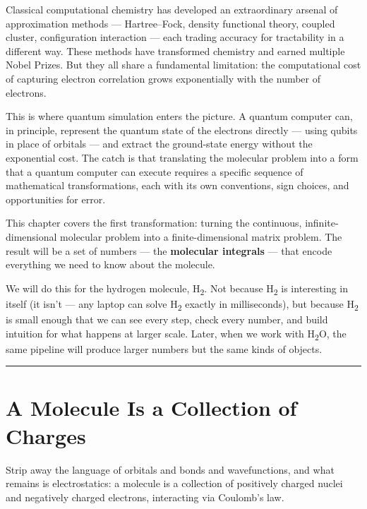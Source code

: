 \documentclass[
  11pt,
  oneside]{book}
\begin{document}
Classical computational chemistry has developed an extraordinary arsenal
of approximation methods --- Hartree--Fock, density functional theory,
coupled cluster, configuration interaction --- each trading accuracy for
tractability in a different way. These methods have transformed
chemistry and earned multiple Nobel Prizes. But they all share a
fundamental limitation: the computational cost of capturing electron
correlation grows exponentially with the number of electrons.

This is where quantum simulation enters the picture. A quantum computer
can, in principle, represent the quantum state of the electrons directly
--- using qubits in place of orbitals --- and extract the ground-state
energy without the exponential cost. The catch is that translating the
molecular problem into a form that a quantum computer can execute
requires a specific sequence of mathematical transformations, each with
its own conventions, sign choices, and opportunities for error.

This chapter covers the first transformation: turning the continuous,
infinite-dimensional molecular problem into a finite-dimensional matrix
problem. The result will be a set of numbers --- the \textbf{molecular
integrals} --- that encode everything we need to know about the
molecule.

We will do this for the hydrogen molecule, H\textsubscript{2}. Not because H\textsubscript{2} is
interesting in itself (it isn't --- any laptop can solve H\textsubscript{2} exactly in
milliseconds), but because H\textsubscript{2} is small enough that we can see every
step, check every number, and build intuition for what happens at larger
scale. Later, when we work with H\textsubscript{2}O, the same pipeline will produce
larger numbers but the same kinds of objects.

\begin{center}\rule{0.5\linewidth}{0.5pt}\end{center}

\section{A Molecule Is a Collection of
Charges}\label{a-molecule-is-a-collection-of-charges}

Strip away the language of orbitals and bonds and wavefunctions, and
what remains is electrostatics: a molecule is a collection of positively
charged nuclei and negatively charged electrons, interacting via
Coulomb's law.
\end{document}

